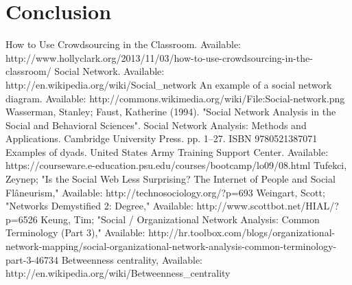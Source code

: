 \documentclass[conference,letterpaper]{IEEEtran}
\begin{document}


\section{Conclusion}


\begin{thebibliography}{1}
How to Use Crowdsourcing in the Classroom. Available: http://www.hollyclark.org/2013/11/03/how-to-use-crowdsourcing-in-the-classroom/
Social Network. Available: http://en.wikipedia.org/wiki/Social\_network
An example of a social network diagram. Available: http://commons.wikimedia.org/wiki/File:Social-network.png
Wasserman, Stanley; Faust, Katherine (1994). "Social Network Analysis in the Social and Behavioral Sciences". Social Network Analysis: Methods and Applications. Cambridge University Press. pp. 1–27. ISBN 9780521387071
Examples of dyads. United States Army Training Support Center. Available: https://courseware.e-education.psu.edu/courses/bootcamp/lo09/08.html
Tufekci, Zeynep; "Is the Social Web Less Surprising? The Internet of People and Social Flâneurism," Available: http://technosociology.org/?p=693
Weingart, Scott; "Networks Demystified 2: Degree," Available: http://www.scottbot.net/HIAL/?p=6526
Keung, Tim; "Social / Organizational Network Analysis: Common Terminology (Part 3)," Available: http://hr.toolbox.com/blogs/organizational-network-mapping/social-organizational-network-analysis-common-terminology-part-3-46734
Betweenness centrality, Available: http://en.wikipedia.org/wiki/Betweenness\_centrality

\end{thebibliography}
\end{document}

